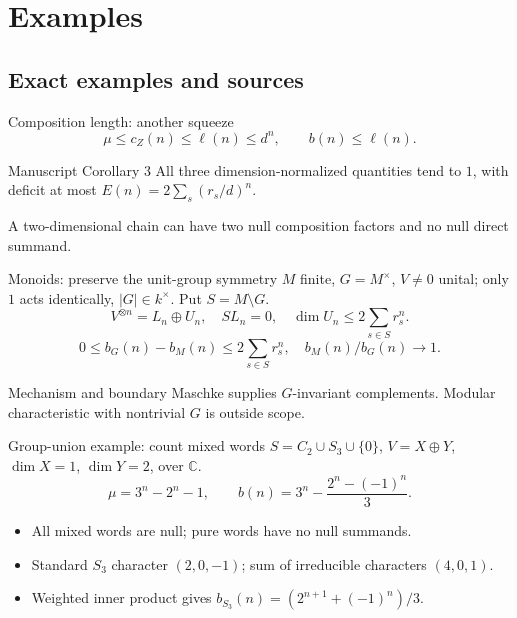 \documentclass{beamer}
\begin{document}
\section{Examples}
\subsection{Exact examples and sources}
\begin{frame}{Composition length: another squeeze}
\[
\mu\leq c_Z(n)\leq\ell(n)\leq d^n,\qquad b(n)\leq\ell(n).
\]
\begin{block}{Manuscript Corollary 3}
All three dimension-normalized quantities tend to $1$, with deficit at most $E(n)=2\sum_s(r_s/d)^n$.
\end{block}
A two-dimensional chain can have two null composition factors and no null direct summand.
\end{frame}
\begin{frame}{Monoids: preserve the unit-group symmetry}
\small
$M$ finite, $G=M^\times$, $V\ne0$ unital; only $1$ acts identically, $|G|\in k^\times$. Put $S=M\setminus G$.
\[
V^{\otimes n}=L_n\oplus U_n,\quad SL_n=0,\quad
\dim U_n\leq2\sum_{s\in S}r_s^n.
\]
\[
0\leq b_G(n)-b_M(n)\leq2\sum_{s\in S}r_s^n,\quad b_M(n)/b_G(n)\to1.
\]
\begin{block}{Mechanism and boundary}
Maschke supplies $G$-invariant complements. Modular characteristic with nontrivial $G$ is outside scope.
\end{block}
\end{frame}
\begin{frame}{Group-union example: count mixed words}
$S=C_2\cup S_3\cup\{0\}$, $V=X\oplus Y$, $\dim X=1$, $\dim Y=2$, over $\mathbb C$.
\[
\mu=3^n-2^n-1,\qquad b(n)=3^n-\frac{2^n-(-1)^n}{3}.
\]
\begin{itemize}
\item All mixed words are null; pure words have no null summands.
\item Standard $S_3$ character $(2,0,-1)$; sum of irreducible characters $(4,0,1)$.
\item Weighted inner product gives $b_{S_3}(n)=(2^{n+1}+(-1)^n)/3$.
\end{itemize}
\end{frame}
\end{document}
